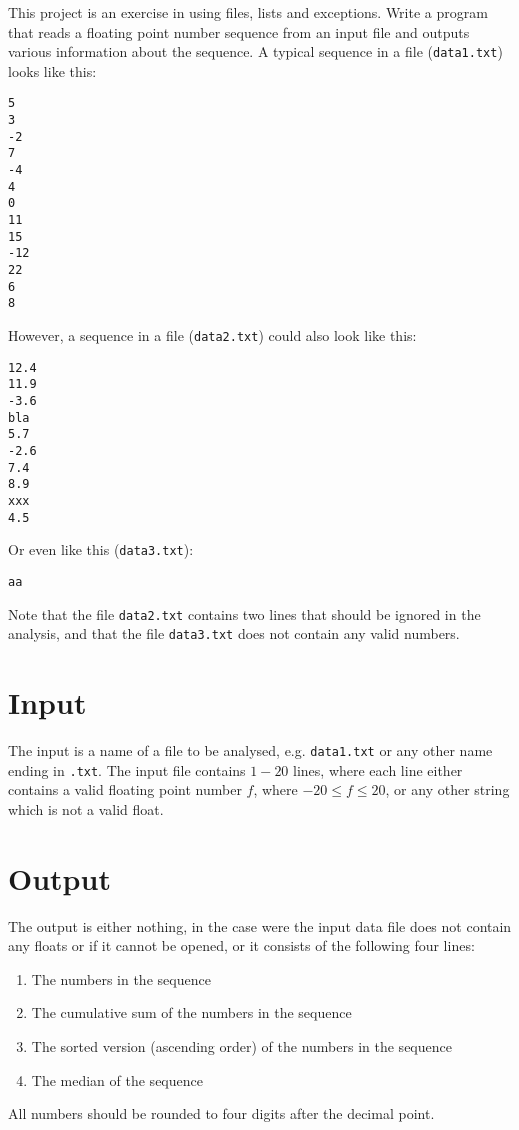 
This project is an exercise in using files, lists and exceptions.
Write a program that reads a floating point number sequence from an input file and outputs various information about the sequence.
A typical sequence in a file (\texttt{data1.txt}) looks like this:

\begin{verbatim}
5
3
-2
7
-4
4
0
11
15
-12
22
6
8
\end{verbatim}

\noindent
However, a sequence in a file (\texttt{data2.txt}) could also look like this:
\begin{verbatim}
12.4
11.9
-3.6
bla  
5.7
-2.6
7.4
8.9
xxx
4.5
\end{verbatim}

\noindent
Or even like this (\texttt{data3.txt}):
\begin{verbatim}
aa
\end{verbatim}


Note that the file \texttt{data2.txt} contains two lines that should be ignored in the analysis, and that the file \texttt{data3.txt} does not contain any valid numbers.

\pagebreak

\section*{Input}
The input is a name of a file to be analysed, e.g. \texttt{data1.txt} or any other name ending in \texttt{.txt}.
The input file contains $1-20$ lines, where each line either contains a valid floating point number $f$, where $-20 \le f \le 20$, or any other string which is not a valid float.

\section*{Output}
The output is either nothing, in the case were the input data file does not contain any floats or if it cannot be opened, or it consists of the following four lines:
\begin{enumerate}
    \item The numbers in the sequence
    \item The cumulative sum of the numbers in the sequence
    \item The sorted version (ascending order) of the numbers in the sequence 
    \item The median of the sequence
\end{enumerate}

All numbers should be rounded to four digits after the decimal point. 

